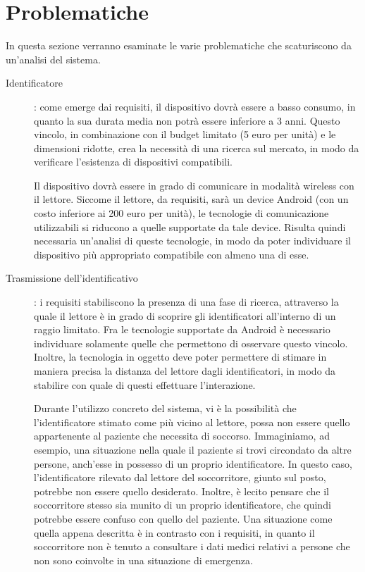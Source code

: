 \documentclass[a4paper,12pt]{report}
\begin{document}
\section{Problematiche}\label{issues}
In questa sezione verranno esaminate le varie problematiche che scaturiscono da un'analisi del sistema.
\begin{description}
	\item[Identificatore]: come emerge dai requisiti, il dispositivo dovrà essere a basso consumo, in quanto la sua durata media non potrà essere inferiore a 3 anni. Questo vincolo, in combinazione con il budget limitato (5 euro per unità) e le dimensioni ridotte, crea la necessità di una ricerca sul mercato, in modo da verificare l'esistenza di dispositivi compatibili.
	
	Il dispositivo dovrà essere in grado di comunicare in modalità wireless con il lettore. Siccome il lettore, da requisiti, sarà un device Android (con un costo inferiore ai 200 euro per unità), le tecnologie di comunicazione utilizzabili si riducono a quelle supportate da tale device. Risulta quindi necessaria un'analisi di queste tecnologie, in modo da poter individuare il dispositivo più appropriato compatibile con almeno una di esse. 
	
	\item[Trasmissione dell'identificativo]: i requisiti stabiliscono la presenza di una fase di ricerca, attraverso la quale il lettore è in grado di scoprire gli identificatori all'interno di un raggio limitato. Fra le tecnologie supportate da Android è necessario individuare solamente quelle che permettono di osservare questo vincolo. Inoltre, la tecnologia in oggetto deve poter permettere di stimare in maniera precisa la distanza del lettore dagli identificatori, in modo da stabilire con quale di questi effettuare l'interazione.
	
	Durante l'utilizzo concreto del sistema, vi è la possibilità che l'identificatore stimato come più vicino al lettore, possa non essere quello appartenente al paziente che necessita di soccorso. Immaginiamo, ad esempio, una situazione nella quale il paziente si trovi circondato da altre persone, anch'esse in possesso di un proprio identificatore. In questo caso, l'identificatore rilevato dal lettore del soccorritore, giunto sul posto, potrebbe non essere quello desiderato. Inoltre, è lecito pensare che il soccorritore stesso sia munito di un proprio identificatore, che quindi potrebbe essere confuso con quello del paziente. Una situazione come quella appena descritta è in contrasto con i requisiti, in quanto il soccorritore non è tenuto a consultare i dati medici relativi a persone che non sono coinvolte in una situazione di emergenza. 
	

\end{description}
\end{document}
